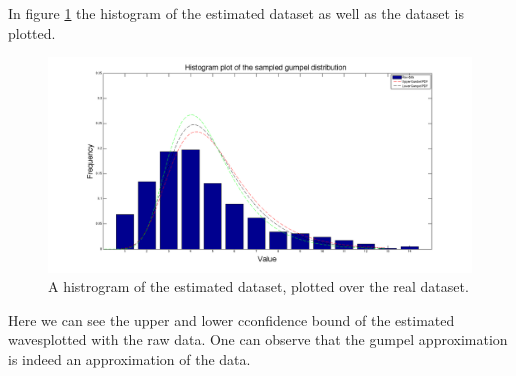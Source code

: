 In figure \ref{fig:estwaves} the histogram of the estimated dataset as well as the dataset is plotted.

\begin{figure}[H]
\centering
\includegraphics[scale=0.26]{./Figures/estwaves.png}

\label{fig:estwaves}
\caption{A histrogram of the estimated dataset, plotted over the real dataset.}
\end{figure} 

Here we can see the upper and lower cconfidence bound of the estimated wavesplotted with the raw data. One can observe that the gumpel approximation is indeed an approximation of the data.

